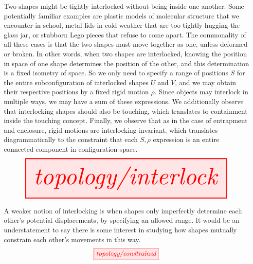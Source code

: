 \begin{myboxR}
\begin{defn}[Interlock]\label{defn:interlocked}
Two shapes might be tightly interlocked without being inside one another. Some potentially familiar examples are plastic models of molecular structure that we encounter in school, metal lids in cold weather that are too tightly hugging the glass jar, or stubborn Lego pieces that refuse to come apart. The commonality of all these cases is that the two shapes must move together as one, unless deformed or broken. In other words, when two shapes are interlocked, knowing the position in space of one shape determines the position of the other, and this determination is a fixed isometry of space. So we only need to specify a range of positions $S$ for the entire subconfiguration of interlocked shapes $U$ and $V$, and we may obtain their respective positions by a fixed rigid motion $\rho$. Since objects may interlock in multiple ways, we may have a sum of these expressions. We additionally observe that interlocking shapes should also be touching, which translates to containment inside the touching concept. Finally, we observe that as in the case of entrapment and enclosure, rigid motions are interlocking-invariant, which translates diagrammatically to the constraint that each $S,\rho$ expression is an entire connected component in configuration space.
\[\resizebox{\textwidth}{!}{\tikzfig{topology/interlock}}\]
\end{defn}
\end{myboxR}

\begin{myboxB}
\begin{defn}\label{defn:constrained}
A weaker notion of interlocking is when shapes only imperfectly determine each other's potential displacements, by specifying an allowed range. It would be an understatement to say there is some interest in studying how shapes mutually constrain each other's movements in this way.
\[\tikzfig{topology/constrained}\]
\end{defn}
\end{myboxB}

